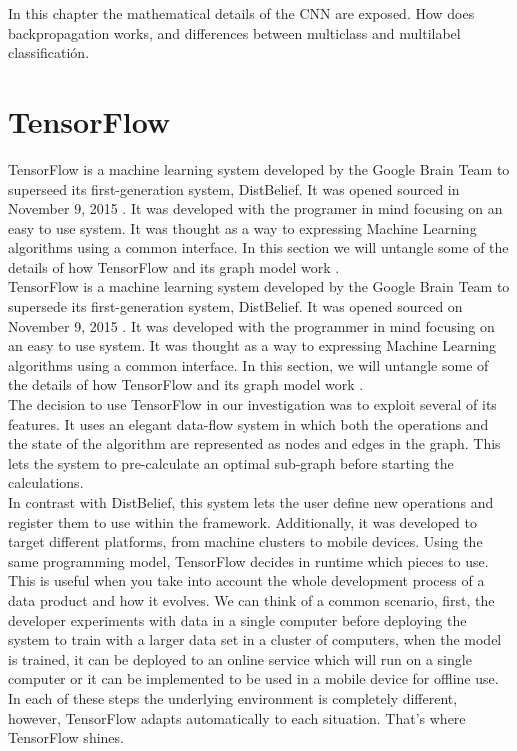 In this chapter the mathematical details of the CNN are exposed. How does backpropagation works, and differences between multiclass and multilabel classificatión.\\

\section{TensorFlow}

TensorFlow is a machine learning system developed by the Google Brain Team to superseed its first-generation system, DistBelief. It was opened sourced in November 9, 2015 . It was developed with the programer in mind focusing on an easy to use system. It was thought as a way to expressing Machine Learning algorithms using a common interface. In this section we will untangle some of the details of how TensorFlow and its graph model work \cite{DBLP:journals/corr/AbadiBCCDDDGIIK16}.\\

TensorFlow is a machine learning system developed by the Google Brain Team to supersede its first-generation system, DistBelief. It was opened sourced on November 9, 2015 \cite{tensorflow2015-whitepaper}. It was developed with the programmer in mind focusing on an easy to use system. It was thought as a way to expressing Machine Learning algorithms using a common interface. In this section, we will untangle some of the details of how TensorFlow and its graph model work \cite{DBLP:journals/corr/AbadiBCCDDDGIIK16}.\\

The decision to use TensorFlow in our investigation was to exploit several of its features. It uses an elegant data-flow system in which both the operations and the state of the algorithm are represented as nodes and edges in the graph. This lets the system to pre-calculate an optimal sub-graph before starting the calculations.\\

In contrast with DistBelief, this system lets the user define new operations and register them to use within the framework. Additionally, it was developed to target different platforms, from machine clusters to mobile devices. Using the same programming model, TensorFlow decides in runtime which pieces to use. This is useful when you take into account the whole development process of a data product and how it evolves. We can think of a common scenario, first, the developer experiments with data in a single computer before deploying the system to train with a larger data set in a cluster of computers, when the model is trained, it can be deployed to an online service which will run on a single computer or it can be implemented to be used in a mobile device for offline use. In each of these steps the underlying environment is completely different, however, TensorFlow adapts automatically to each situation. That's where TensorFlow shines.\\


